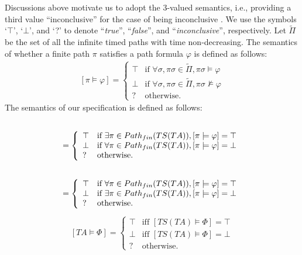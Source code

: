\documentclass[10pt,conference,compsocconf,letterpaper]{IEEEtran}
\begin{document}
Discussions above motivate us to adopt the 3-valued semantics, i.e., providing a third value ``inconclusive'' for the case of being inconclusive \cite{Bauer11, Wei12}. We use the symbols `$\top$', `$\bot$', and `?' to denote ``\textit{true}'', ``\textit{false}'', and ``\textit{inconclusive}'', respectively. Let $\widetilde{\Pi}$ be the set of all the infinite timed paths with time non-decreasing. The semantics of whether a finite path $\pi$ satisfies a path formula $\varphi$ is defined as follows:
\begin{eqnarray}\label{eq:path and varphi}
[\pi \models \varphi] = \left\{ \begin{array}{ll}
\top & \textrm{if } \forall\sigma, \pi\sigma\in\widetilde{\Pi}, \pi\sigma\models\varphi\\
\bot & \textrm{if } \forall\sigma, \pi\sigma\in\widetilde{\Pi}, \pi\sigma\not\models\varphi\\
? & \textrm{otherwise.}
\end{array} \right.
\end{eqnarray}
The semantics of our specification is defined as follows:
\begin{eqnarray}
[TS(TA) \models \exists \varphi] \hspace{2.2in}\nonumber\\ =\left\{ \begin{array}{ll}
\top & \textrm{if } \exists \pi\in Path_{fin}(TS(TA)), [\pi\models \varphi] = \top\\
\bot & \textrm{if } \forall \pi\in Path_{fin}(TS(TA)), [\pi\models \varphi] = \bot\\
? & \textrm{otherwise.}
\end{array} \right.
\end{eqnarray}
\vspace{-0.15in}
\begin{eqnarray}
[TS(TA) \models \forall \varphi] \hspace{2.2in}\nonumber\\ =\left\{ \begin{array}{ll}
\top & \textrm{if } \forall \pi\in Path_{fin}(TS(TA)), [\pi\models \varphi] = \top\\
\bot & \textrm{if } \exists \pi\in Path_{fin}(TS(TA)), [\pi\models \varphi] = \bot\\
? & \textrm{otherwise.}
\end{array} \right.
\end{eqnarray}
\vspace{-0.15in}
\begin{eqnarray}\label{eq:TA and Phi}
[TA\models \Phi] = \left\{ \begin{array}{ll}
\top & \textrm{iff } [TS(TA)\models \Phi] = \top\\
\bot & \textrm{iff } [TS(TA)\models \Phi] = \bot\\
? & \textrm{otherwise.}
\end{array} \right.
\end{eqnarray}
\end{document}
